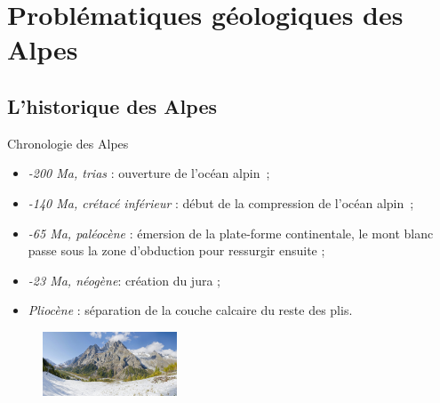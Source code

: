 \documentclass{beamer}
\begin{document}
\section{Problématiques géologiques des Alpes}

\subsection{L'historique des Alpes}
\begin{frame}{Chronologie des Alpes}
  \begin{itemize}
    \item \textit{-200 Ma, trias} : ouverture de l’océan alpin~;
    \item \textit{-140 Ma, crétacé inférieur} : début de la compression de l’océan alpin~;
    \item \textit{-65 Ma, paléocène} : émersion de la plate-forme continentale, le mont blanc passe sous la zone d'obduction pour ressurgir ensuite ;
    \item \textit{-23 Ma, néogène}: création du jura ;
    \item \textit{Pliocène} : séparation de la couche calcaire du reste des plis.
  \end{itemize}
  \begin{center}
    \begin{figure}
      \includegraphics[width=4cm]{Images/Images_Alexis/mont_blanc.jpg}
    \end{figure}
  \end{center}
\end{frame}
\end{document}
